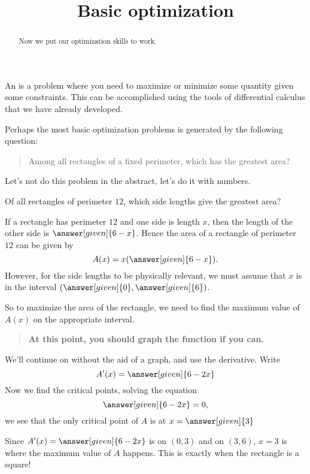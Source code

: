 \documentclass{ximera}
\title[Dig-In:]{Basic optimization}
\begin{document}
\begin{abstract}
  Now we put our optimization skills to work.
\end{abstract}
\maketitle

An  is a problem where you need to maximize
or minimize some quantity given some constraints. This can be
accomplished using the tools of differential calculus that we have
already developed.

Perhaps the most basic optimization problems is generated by the
following question:

\begin{quote}
  Among all rectangles of a fixed perimeter, which has the greatest area?
\end{quote}

Let's not do this problem in the abstract, let's do it with numbers.

\begin{example}
  Of all rectangles of perimeter $12$, which side lengths give the greatest area?
  \begin{explanation}
    If a rectangle has perimeter $12$ and one side is length $x$, then
    the length of the other side is $\answer[given]{6-x}$.
    Hence the area of a rectangle of perimeter $12$ can be given by
    \[
    A(x) = x(\answer[given]{6-x}).
    \]
    However, for the side lengths to be physically relevant, we must
    assume that $x$ is in the interval
    $(\answer[given]{0},\answer[given]{6})$. 
      
    So to maximize the area of the rectangle, we need to find the
    maximum value of $A(x)$ on the appropriate interval.
    \begin{quote}
      \textbf{At this point, you should graph the function if you can.}
    \end{quote}
    We'll continue on without the aid of a graph, and use the derivative. Write
    \[
    A'(x) = \answer[given]{6-2x}
    \]
    Now we find the critical points, solving the equation
    \[
    \answer[given]{6-2x} = 0,
    \]
    we see that the only critical point of $A$ is at $x=\answer[given]{3}$
    
    Since $A'(x) = \answer[given]{6-2x}$ is
     on
    $(0,3)$ and
     on
    $(3,6)$, $x=3$ is where the maximum value of $A$ happens.  This is
      exactly when the rectangle is a square!
  \end{explanation}
\end{example}
\end{document}
